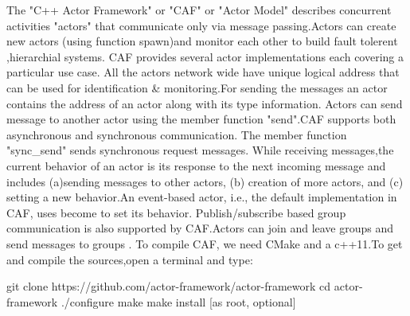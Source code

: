 The "C++ Actor Framework" or "CAF" or "Actor Model" describes concurrent activities "actors" that communicate only via message passing.Actors can create new actors (using function spawn)and monitor each other to build fault tolerent ,hierarchial systems.
CAF provides several actor implementations each covering a particular use case. All the actors network wide have unique logical address that can be used for identification & monitoring.For sending the messages an actor contains the address of an actor along with its type information.
Actors can send message to another actor using the member function "send".CAF supports both asynchronous and synchronous communication. The member function "sync_send" sends synchronous request messages.
While receiving messages,the current behavior of an actor is its response to the next incoming message and includes (a)sending messages to other actors, (b) creation of more actors, and (c) setting a new behavior.An event-based actor, i.e., the default implementation in CAF, uses become to set its behavior.
Publish/subscribe based group communication is also supported by CAF.Actors can join and leave groups and send messages to groups .
To compile CAF, we need CMake and a c++11.To get and compile the sources,open a terminal and type:

git clone https://github.com/actor-framework/actor-framework
cd actor-framework
./configure
make
make install [as root, optional]
